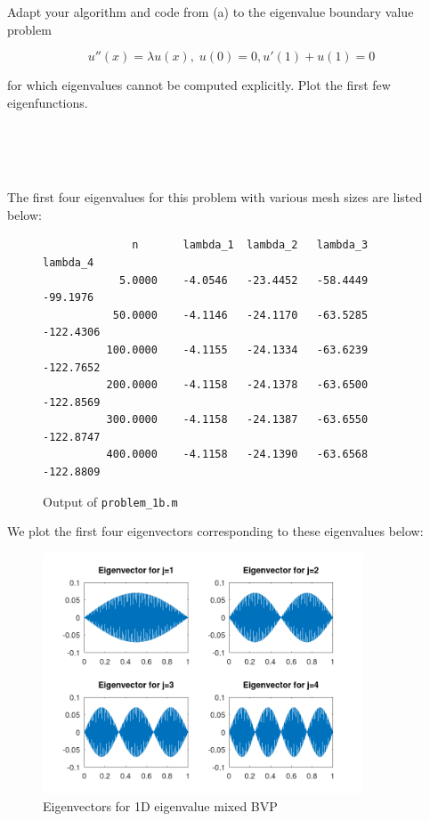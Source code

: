 Adapt your algorithm and code from (a) to the eigenvalue boundary value problem

$$
u''(x) = \lambda u(x), \; u(0) = 0, u'(1) + u(1) = 0
$$

for which eigenvalues cannot be computed explicitly. Plot the first few eigenfunctions.

\begin{solution}\ \\\\
    \ \\
    \newpage
    \hfill\vfill

    \pagebreak
    
    \noindent The first four eigenvalues for this problem with various mesh sizes are listed below:

    \begin{figure}[h]
        \begin{verbatim}
              n       lambda_1  lambda_2   lambda_3  lambda_4
            5.0000    -4.0546   -23.4452   -58.4449   -99.1976
           50.0000    -4.1146   -24.1170   -63.5285  -122.4306
          100.0000    -4.1155   -24.1334   -63.6239  -122.7652
          200.0000    -4.1158   -24.1378   -63.6500  -122.8569
          300.0000    -4.1158   -24.1387   -63.6550  -122.8747
          400.0000    -4.1158   -24.1390   -63.6568  -122.8809
        \end{verbatim}
        \caption{Output of \texttt{problem\_1b.m}}
    \end{figure}

    We plot the first four eigenvectors corresponding to these eigenvalues below:


    \begin{figure}[h]
        \centering
        \includegraphics[width=0.85\textwidth]{problem_1b_eigenvectors.png}
        \caption{Eigenvectors for 1D eigenvalue mixed BVP}
    \end{figure}
\end{solution}